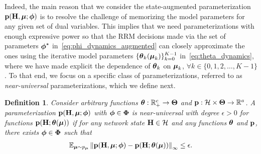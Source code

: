 \documentclass[lettersize,journal]{IEEEtran}
\newtheorem{definition}{\hspace{0pt}\bf Definition}
\def\E{\mathbb{E}}
\begin{document}
Indeed, the main reason that we consider the state-augmented parameterization ${\mathbf p}({\mathbf H}, \boldsymbol{\mu}; \boldsymbol{\phi})$ is to resolve the challenge of memorizing the model parameters for any given set of dual variables. This implies that we need parameterizations with enough expressive power so that the RRM decisions made via the set of parameters $\boldsymbol{\phi}^{\star}$ in~\eqref{eq:phi_dynamics_augmented} can closely approximate the ones using the iterative model parameters $\{\boldsymbol{\theta}_k (\boldsymbol{\mu}_k)\}_{k=0}^{K-1}$ in~\eqref{eq:theta_dynamics}, where we have made explicit the dependence of $\boldsymbol{\theta}_k$ on $\boldsymbol{\mu}_k$, $\forall k\in\{0,1,2,\dots,K-1\}$. To that end, we focus on a specific class of parameterizations, referred to as \emph{near-universal} parameterizations, which we define next.

\begin{definition}\label{def:near_universality}
Consider arbitrary functions $\boldsymbol{\theta}: {\mathbb R}_+^c \to \boldsymbol{\Theta}$ and ${\mathbf p}: {\mathcal H} \times \boldsymbol{\Theta} \to {\mathbb R}^a$. A parameterization ${\mathbf p}({\mathbf H}, \boldsymbol{\mu}; \boldsymbol{\phi})$ with $\boldsymbol{\phi} \in \boldsymbol{\Phi}$ is near-universal with degree $\epsilon > 0$ for functions ${\mathbf p}({\mathbf H}; \boldsymbol{\theta}(\boldsymbol{\mu}))$ if for any network state ${\mathbf H} \in {\ensuremath{\mathcal H}}$ and any functions $\boldsymbol{\theta}$ and ${\mathbf p}$, there exists $\boldsymbol{\phi} \in \boldsymbol{\Phi}$ such that
\begin{align}
\E_{\bbmu \sim p_{\bbmu}}\left\| \bbp(\bbH, \bbmu; \bbphi) - \bbp(\bbH; \bbtheta(\bbmu)) \right\|_{\infty} \leq \epsilon.
\end{align}
\end{definition}
\end{document}
